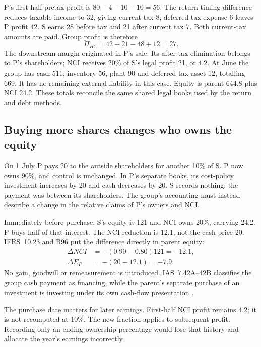 P's first-half pretax profit is \(80-4-10-10=56\). The return timing difference
reduces taxable income to 32, giving current tax 8; deferred tax expense 6
leaves P profit 42. S earns 28 before tax and 21 after current tax 7. Both
current-tax amounts are paid. Group profit is therefore
\begin{equation}
 \Pi_{H1}=42+21-48+12=27.
 \label{eq:joined-h1-profit}
\end{equation}
The downstream margin originated in P's sale. Its after-tax elimination belongs
to P's shareholders; NCI receives 20\% of S's legal profit 21, or 4.2. At June
the group has cash 511, inventory 56, plant 90 and deferred tax asset 12, totalling
669. It has no remaining external liability in this case. Equity is parent
644.8 plus NCI 24.2. These totals reconcile the same shared legal books used by
the return and debt methods.

\subsection{Buying more shares changes who owns the equity}

On 1 July P pays 20 to the outside shareholders for another 10\% of S. P now
owns 90\%, and control is unchanged. In P's separate books, its cost-policy
investment increases by 20 and cash decreases by 20. S records nothing: the
payment was between its shareholders. The group's accounting must instead
describe a change in the relative claims of P's owners and NCI.

Immediately before purchase, S's equity is 121 and NCI owns 20\%, carrying
24.2. P buys half of that interest. The NCI reduction is 12.1, not the cash
price 20. IFRS~10.23 and B96 put the difference directly in parent equity:
\begin{align}
 \Delta NCI&=-(0.90-0.80)121=-12.1,\\
 \Delta E_P&=-(20-12.1)=-7.9.
 \label{eq:joined-nci-purchase}
\end{align}
No gain, goodwill or remeasurement is introduced. IAS~7.42A--42B classifies the
group cash payment as financing, while the parent's separate purchase of an
investment is investing under its own cash-flow presentation
\citep[IFRS~10.23,B96; IAS~7.16,42A--42B; IAS~27.10]{eu20231803}.

The purchase date matters for later earnings. First-half NCI profit remains
4.2; it is not recomputed at 10\%. The new fraction applies to subsequent
profit. Recording only an ending ownership percentage would lose that history
and allocate the year's earnings incorrectly.

